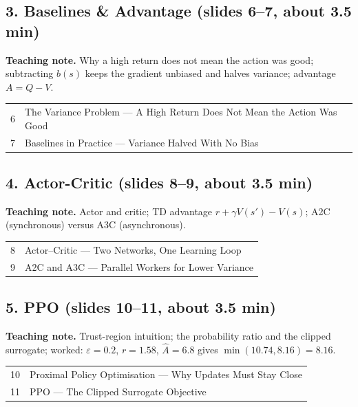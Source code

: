 \documentclass[11pt]{article}
\begin{document}
\subsection{3. Baselines \& Advantage \normalfont\small\color{GreyN}(slides 6--7, about 3.5 min)}

\textbf{Teaching note.} Why a high return does not mean the action was good; subtracting $b(s)$ keeps the gradient unbiased and halves variance; advantage $A=Q-V$.

\begin{center}\small\renewcommand{\arraystretch}{1.1}\begin{tabularx}{\textwidth}{@{}r X@{}}6 & The Variance Problem --- A High Return Does Not Mean the Action Was Good\\
7 & Baselines in Practice --- Variance Halved With No Bias\\\end{tabularx}\end{center}

\subsection{4. Actor-Critic \normalfont\small\color{GreyN}(slides 8--9, about 3.5 min)}

\textbf{Teaching note.} Actor and critic; TD advantage $r+\gamma V(s')-V(s)$; A2C (synchronous) versus A3C (asynchronous).

\begin{center}\small\renewcommand{\arraystretch}{1.1}\begin{tabularx}{\textwidth}{@{}r X@{}}8 & Actor--Critic --- Two Networks, One Learning Loop\\
9 & A2C and A3C --- Parallel Workers for Lower Variance\\\end{tabularx}\end{center}

\subsection{5. PPO \normalfont\small\color{GreyN}(slides 10--11, about 3.5 min)}

\textbf{Teaching note.} Trust-region intuition; the probability ratio and the clipped surrogate; worked: $\varepsilon=0.2$, $r=1.58$, $\hat A=6.8$ gives $\min(10.74,8.16)=8.16$.

\begin{center}\small\renewcommand{\arraystretch}{1.1}\begin{tabularx}{\textwidth}{@{}r X@{}}10 & Proximal Policy Optimisation --- Why Updates Must Stay Close\\
11 & PPO --- The Clipped Surrogate Objective\\\end{tabularx}\end{center}
\end{document}
